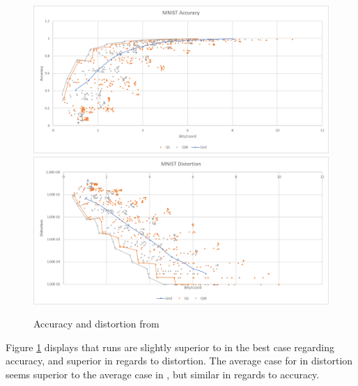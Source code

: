 \begin{figure}[h!]
\includegraphics[width=\textwidth]{figures/graphs/mnist_accuracy}
\includegraphics[width=\textwidth]{figures/graphs/mnist_distortion}
\caption{Accuracy and distortion from \mnist{}}
\label{fig:graph mnist}
\end{figure}
\clearpage
Figure \ref{fig:graph mnist} displays that \qsr{} runs are slightly superior to \qs{} in the best case regarding accuracy, and superior in regards to distortion. The average case for \qsr{} in distortion seems superior to the average case in \qs{}, but similar in regards to accuracy.

